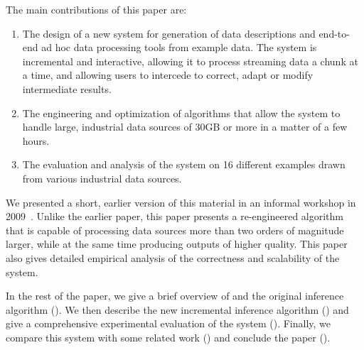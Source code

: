 The main contributions of this paper are:
\begin{enumerate}
\item The design of a new system for generation of data descriptions
and end-to-end ad hoc data processing tools from example data.  
The system is incremental and interactive, allowing it to process
streaming data a chunk at a time, and allowing users to intercede
to correct, adapt or modify intermediate results. 
\item The engineering and optimization of algorithms that allow
the system to handle large, industrial data sources of 30GB or
more in a matter of a few hours.
\item The evaluation and analysis of the system
on 16 different examples drawn from
various industrial data sources.
\end{enumerate}

We presented a short, earlier version of this material in an informal workshop 
in 2009~\cite{wasl09:zhu+}. 
Unlike the earlier paper, this paper presents a re-engineered algorithm
that is capable of processing data sources more than two orders of magnitude
larger, while at the same time producing outputs of higher quality. 
This paper also gives detailed empirical analysis of the 
correctness and scalability of the system.

In the rest of the paper, we give a brief overview of \pads{} and the original
\learnpads{} inference algorithm (). We then describe
the new incremental inference algorithm ()
and give a comprehensive experimental
evaluation of the system (). Finally, we compare this
system with some related work () and conclude
the paper ().
